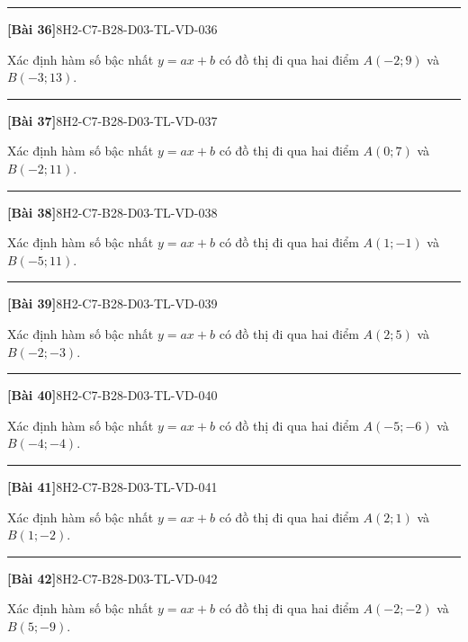 \documentclass[12pt,a4paper]{article}
\newif\ifloigiai
\newenvironment{cauhoi}[2]{%
  \par\medskip\noindent\rule{\textwidth}{0.4pt}\par\nopagebreak
  \noindent\textbf{[#1]}\hfill{\scriptsize\ttfamily #2}\par\nopagebreak\smallskip}{\par}
\newcommand{\loigiai}[1]{\ifloigiai\par\smallskip\noindent\textit{Lời giải.} #1\par\fi}
\begin{document}
\begin{cauhoi}{Bài 36}{8H2-C7-B28-D03-TL-VD-036}
Xác định hàm số bậc nhất $y=ax+b$ có đồ thị đi qua hai điểm $A(-2;9)$ và $B(-3;13)$.
\loigiai{Thay toạ độ $A$, $B$ vào $y=ax+b$ ta có hệ $9=-2a+b$ và $13=-3a+b$. Trừ hai vế: $a=\dfrac{9-13}{-2+3}=-4$. Suy ra $b=9+4\cdot(-2)=1$. Vậy $y=-4x+1$.}
\end{cauhoi}
\begin{cauhoi}{Bài 37}{8H2-C7-B28-D03-TL-VD-037}
Xác định hàm số bậc nhất $y=ax+b$ có đồ thị đi qua hai điểm $A(0;7)$ và $B(-2;11)$.
\loigiai{Thay toạ độ $A$, $B$ vào $y=ax+b$ ta có hệ $7=0a+b$ và $11=-2a+b$. Trừ hai vế: $a=\dfrac{7-11}{0+2}=-2$. Suy ra $b=7+2\cdot(0)=7$. Vậy $y=-2x+7$.}
\end{cauhoi}
\begin{cauhoi}{Bài 38}{8H2-C7-B28-D03-TL-VD-038}
Xác định hàm số bậc nhất $y=ax+b$ có đồ thị đi qua hai điểm $A(1;-1)$ và $B(-5;11)$.
\loigiai{Thay toạ độ $A$, $B$ vào $y=ax+b$ ta có hệ $-1=a+b$ và $11=-5a+b$. Trừ hai vế: $a=\dfrac{-1-11}{1+5}=-2$. Suy ra $b=-1+2\cdot(1)=1$. Vậy $y=-2x+1$.}
\end{cauhoi}
\begin{cauhoi}{Bài 39}{8H2-C7-B28-D03-TL-VD-039}
Xác định hàm số bậc nhất $y=ax+b$ có đồ thị đi qua hai điểm $A(2;5)$ và $B(-2;-3)$.
\loigiai{Thay toạ độ $A$, $B$ vào $y=ax+b$ ta có hệ $5=2a+b$ và $-3=-2a+b$. Trừ hai vế: $a=\dfrac{5+3}{2+2}=2$. Suy ra $b=5-2\cdot(2)=1$. Vậy $y=2x+1$.}
\end{cauhoi}
\begin{cauhoi}{Bài 40}{8H2-C7-B28-D03-TL-VD-040}
Xác định hàm số bậc nhất $y=ax+b$ có đồ thị đi qua hai điểm $A(-5;-6)$ và $B(-4;-4)$.
\loigiai{Thay toạ độ $A$, $B$ vào $y=ax+b$ ta có hệ $-6=-5a+b$ và $-4=-4a+b$. Trừ hai vế: $a=\dfrac{-6+4}{-5+4}=2$. Suy ra $b=-6-2\cdot(-5)=4$. Vậy $y=2x+4$.}
\end{cauhoi}
\begin{cauhoi}{Bài 41}{8H2-C7-B28-D03-TL-VD-041}
Xác định hàm số bậc nhất $y=ax+b$ có đồ thị đi qua hai điểm $A(2;1)$ và $B(1;-2)$.
\loigiai{Thay toạ độ $A$, $B$ vào $y=ax+b$ ta có hệ $1=2a+b$ và $-2=a+b$. Trừ hai vế: $a=\dfrac{1+2}{2-1}=3$. Suy ra $b=1-3\cdot(2)=-5$. Vậy $y=3x-5$.}
\end{cauhoi}
\begin{cauhoi}{Bài 42}{8H2-C7-B28-D03-TL-VD-042}
Xác định hàm số bậc nhất $y=ax+b$ có đồ thị đi qua hai điểm $A(-2;-2)$ và $B(5;-9)$.
\loigiai{Thay toạ độ $A$, $B$ vào $y=ax+b$ ta có hệ $-2=-2a+b$ và $-9=5a+b$. Trừ hai vế: $a=\dfrac{-2+9}{-2-5}=-1$. Suy ra $b=-2+1\cdot(-2)=-4$. Vậy $y=-x-4$.}
\end{cauhoi}
\end{document}
